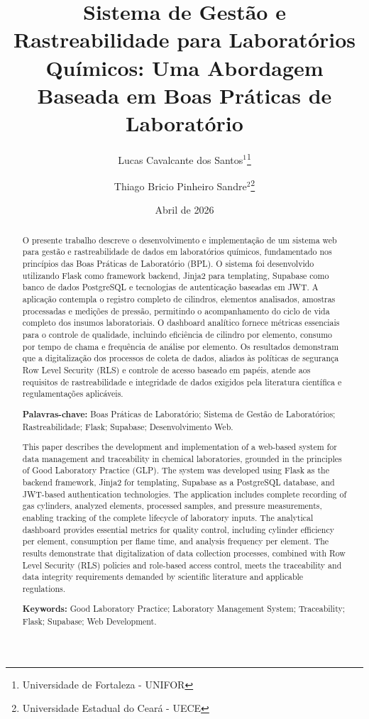 \documentclass[12pt,a4paper]{article}
\title{Sistema de Gestão e Rastreabilidade para Laboratórios Químicos: Uma Abordagem Baseada em Boas Práticas de Laboratório}
\author{Lucas Cavalcante dos Santos$^{1}$\footnote{Universidade de Fortaleza - UNIFOR} \and 
        Thiago Bricio Pinheiro Sandre$^{2}$\footnote{Universidade Estadual do Ceará - UECE}}
\date{Abril de 2026}
\providecommand\关键字[1]{\textbf{#1}}
\begin{document}
\maketitle

\begin{abstract}
O presente trabalho descreve o desenvolvimento e implementação de um sistema web para gestão e rastreabilidade de dados em laboratórios químicos, fundamentado nos princípios das Boas Práticas de Laboratório (BPL). O sistema foi desenvolvido utilizando Flask como framework backend, Jinja2 para templating, Supabase como banco de dados PostgreSQL e tecnologias de autenticação baseadas em JWT. A aplicação contempla o registro completo de cilindros, elementos analisados, amostras processadas e medições de pressão, permitindo o acompanhamento do ciclo de vida completo dos insumos laboratoriais. O dashboard analítico fornece métricas essenciais para o controle de qualidade, incluindo eficiência de cilindro por elemento, consumo por tempo de chama e frequência de análise por elemento. Os resultados demonstram que a digitalização dos processos de coleta de dados, aliados às políticas de segurança Row Level Security (RLS) e controle de acesso baseado em papéis, atende aos requisitos de rastreabilidade e integridade de dados exigidos pela literatura científica e regulamentações aplicáveis.

\textbf{Palavras-chave:} Boas Práticas de Laboratório; Sistema de Gestão de Laboratórios; Rastreabilidade; Flask; Supabase; Desenvolvimento Web.
\end{abstract}


\begin{abstract}
This paper describes the development and implementation of a web-based system for data management and traceability in chemical laboratories, grounded in the principles of Good Laboratory Practice (GLP). The system was developed using Flask as the backend framework, Jinja2 for templating, Supabase as a PostgreSQL database, and JWT-based authentication technologies. The application includes complete recording of gas cylinders, analyzed elements, processed samples, and pressure measurements, enabling tracking of the complete lifecycle of laboratory inputs. The analytical dashboard provides essential metrics for quality control, including cylinder efficiency per element, consumption per flame time, and analysis frequency per element. The results demonstrate that digitalization of data collection processes, combined with Row Level Security (RLS) policies and role-based access control, meets the traceability and data integrity requirements demanded by scientific literature and applicable regulations.

\textbf{Keywords:} Good Laboratory Practice; Laboratory Management System; Traceability; Flask; Supabase; Web Development.
\end{abstract}
\end{document}
